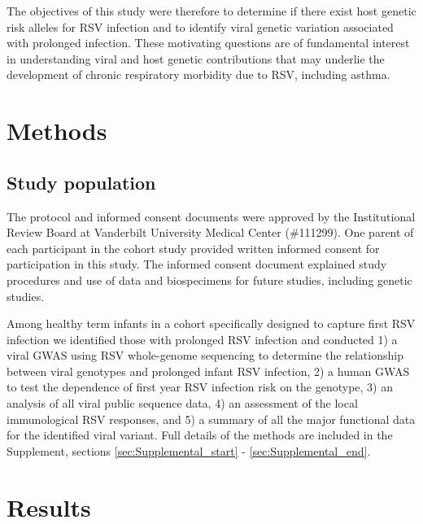 \documentclass{article} %
\begin{document}
The objectives of this study were therefore to determine if there exist host genetic risk alleles for RSV infection and to identify viral genetic variation associated with prolonged infection. 
These motivating questions are of fundamental interest in understanding viral and host genetic contributions that may underlie the development of chronic respiratory morbidity due to RSV, including asthma. 

\section{Methods}

\subsection{Study population}
The protocol and informed consent documents were approved by the Institutional Review Board at Vanderbilt University Medical Center  (\#111299). 
One parent of each participant in the cohort study provided written informed consent for participation in this study. 
The informed consent document explained study procedures and use of data and biospecimens for future studies, including genetic studies. 

Among healthy term infants in a cohort specifically designed to capture first RSV infection we identified those with prolonged RSV infection and conducted 
1) a viral GWAS using RSV whole-genome sequencing to determine the relationship between viral genotypes and prolonged infant RSV infection, 
2) a human GWAS to test the dependence of first year RSV infection risk on the genotype, 
3) an analysis of all viral public sequence data, 
4) an assessment of the local immunological RSV responses, and 
5) a summary of all the major functional data for the identified viral variant. 
Full details of the methods are included in the Supplement, 
sections \ref{sec:Supplemental_start} - \ref{sec:Supplemental_end}.

\section{Results}
\end{document}

